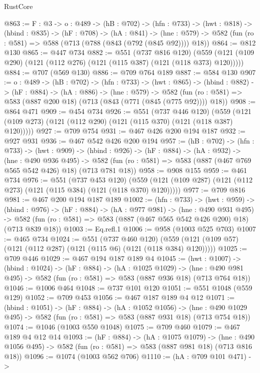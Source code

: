 \begin{lexlean}{RustCore}
\begin{coremodule}
@863 := {F : @3} ->
  {o : @489} ->
  (hB : @702) ->
  (hfn : @733) ->
  (hwt : @818) ->
  (hbind : @835) ->
  (hF : @708) ->
  (hA : @841) ->
  (hne : @579) -> @582 (fun (ro : @581) => @588 (@713 (@788 (@843 (@792 (@845 @92)))) @18))
@864 := @812 @130
@865 := @447 @734
@882 := @551
    (@737 @816 @120)
    (@559 (@121 (@109 @290) (@121 (@112 @276) (@121 (@115 @387) (@121 (@118 @373) @120)))))
@884 := @707 (@569 @130)
@886 := @709 @764 @189
@887 := @584 @130
@907 := {o : @489} ->
  (hB : @702) ->
  (hfn : @733) ->
  (hwt : @865) ->
  (hbind : @882) ->
  (hF : @884) ->
  (hA : @886) ->
  (hne : @579) ->
  @582 (fun (ro : @581) => @583 (@887 @200 @18) (@713 (@843 (@771 (@845 (@775 @92)))) @18))
@908 := @864 @471
@909 := @454 @734
@926 := @551
    (@737 @446 @120)
    (@559 (@121 (@109 @273) (@121 (@112 @290) (@121 (@115 @370) (@121 (@118 @387) @120)))))
@927 := @709 @754
@931 := @467 @426 @200 @194 @187
@932 := @927 @931
@936 := @467 @542 @426 @200 @194
@957 := (hB : @702) ->
  (hfn : @733) ->
  (hwt : @909) ->
  (hbind : @926) ->
  (hF : @884) ->
  (hA : @932) ->
  (hne : @490 @936 @495) ->
  @582 (fun (ro : @581) => @583 (@887 (@467 @769 @565 @542 @426) @18) (@713 @781 @18))
@958 := @908 @155
@959 := @461 @734
@976 := @551
    (@737 @453 @120)
    (@559 (@121 (@109 @287) (@121 (@112 @273) (@121 (@115 @384) (@121 (@118 @370) @120)))))
@977 := @709 @816
@981 := @467 @200 @194 @187 @189
@1002 := (hfn : @733) ->
  (hwt : @959) ->
  (hbind : @976) ->
  (hF : @884) ->
  (hA : @977 @981) ->
  (hne : @490 @931 @495) ->
  @582 (fun (ro : @581) => @583 (@887 (@467 @565 @542 @426 @200) @18) (@713 @839 @18))
@1003 := Eq.refl.{1}
@1006 := @958 (@1003 @525 @703)
@1007 := @465 @734
@1024 := @551
    (@737 @460 @120)
    (@559 (@121 (@109 @57) (@121 (@112 @287) (@121 (@115 @6) (@121 (@118 @384) @120)))))
@1025 := @709 @446
@1029 := @467 @194 @187 @189 @4
@1045 := (hwt : @1007) ->
  (hbind : @1024) ->
  (hF : @884) ->
  (hA : @1025 @1029) ->
  (hne : @490 @981 @495) -> @582 (fun (ro : @581) => @583 (@887 @936 @18) (@713 @764 @18))
@1046 := @1006 @464
@1048 := @737 @101 @120
@1051 := @551 @1048 (@559 @129)
@1052 := @709 @453
@1056 := @467 @187 @189 @4 @12
@1071 := (hbind : @1051) ->
  (hF : @884) ->
  (hA : @1052 @1056) ->
  (hne : @490 @1029 @495) -> @582 (fun (ro : @581) => @583 (@887 @931 @18) (@713 @754 @18))
@1074 := @1046 (@1003 @550 @1048)
@1075 := @709 @460
@1079 := @467 @189 @4 @12 @14
@1093 := (hF : @884) ->
  (hA : @1075 @1079) ->
  (hne : @490 @1056 @495) -> @582 (fun (ro : @581) => @583 (@887 @981 @18) (@713 @816 @18))
@1096 := @1074 (@1003 @562 @706)
@1110 := (hA : @709 @101 @471) ->

\end{coremodule}
\end{lexlean}
